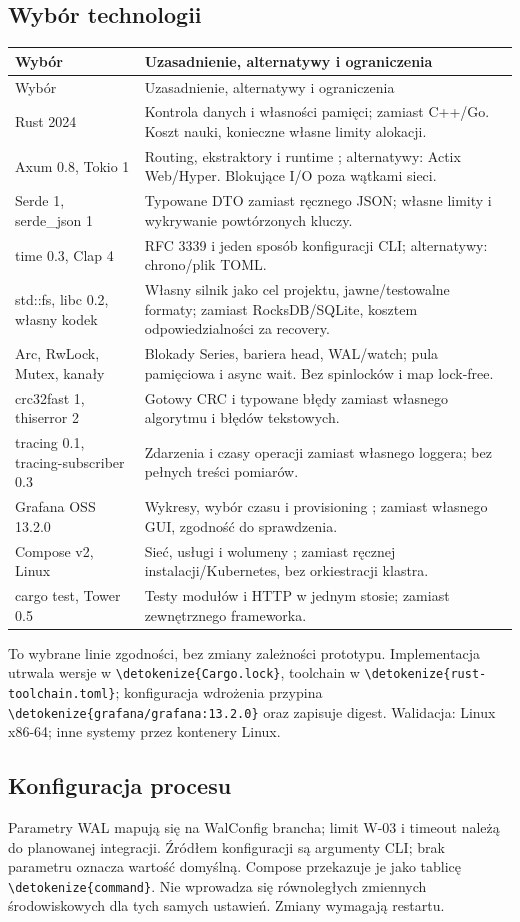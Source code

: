 \documentclass[11pt,a4paper]{article}
\newcommand{\code}[1]{\expandafter\nolinkurl\expandafter{\detokenize{#1}}}
\newcommand{\tabhead}[1]{\toprule #1\\ \midrule\endfirsthead
  \toprule #1\\ \midrule\endhead \bottomrule\endfoot}
\begin{document}
\subsection{Wybór technologii}
\begin{longtable}{P{37mm}P{119mm}}
\tabhead{Wybór & Uzasadnienie, alternatywy i ograniczenia}
Rust 2024 & Kontrola danych i własności pamięci; zamiast C++/Go.
Koszt nauki, konieczne własne limity alokacji.\\
Axum 0.8, Tokio 1 & Routing, ekstraktory i runtime \cite{axum};
alternatywy: Actix Web/Hyper. Blokujące I/O poza wątkami sieci.\\
Serde 1, serde\_json 1 & Typowane DTO zamiast ręcznego JSON;
własne limity i wykrywanie powtórzonych kluczy.\\
time 0.3, Clap 4 & RFC 3339 i jeden sposób konfiguracji CLI;
alternatywy: chrono/plik TOML.\\
std::fs, libc 0.2, własny kodek & Własny silnik jako cel projektu, jawne/testowalne
formaty; zamiast RocksDB/SQLite, kosztem odpowiedzialności za recovery.\\
Arc, RwLock, Mutex, kanały & Blokady Series, bariera head, WAL/watch;
pula pamięciowa i async wait. Bez spinlocków i map lock-free.\\
crc32fast 1, thiserror 2 & Gotowy CRC i typowane błędy zamiast własnego
algorytmu i błędów tekstowych.\\
tracing 0.1, tracing-subscriber 0.3 & Zdarzenia i czasy operacji
zamiast własnego loggera; bez pełnych treści pomiarów.\\
Grafana OSS 13.2.0 & Wykresy, wybór czasu i provisioning
\cite{grafana-provision}; zamiast własnego GUI, zgodność do sprawdzenia.\\
Compose v2, Linux & Sieć, usługi i wolumeny \cite{compose};
zamiast ręcznej instalacji/Kubernetes, bez orkiestracji klastra.\\
cargo test, Tower 0.5 & Testy modułów i HTTP w jednym stosie;
zamiast zewnętrznego frameworka.\\
\end{longtable}

To wybrane linie zgodności, bez zmiany zależności prototypu.
Implementacja utrwala wersje w \code{Cargo.lock}, toolchain
w \code{rust-toolchain.toml}; konfiguracja wdrożenia przypina
\code{grafana/grafana:13.2.0} oraz zapisuje digest.
Walidacja: Linux x86-64; inne systemy przez kontenery Linux.

\subsection{Konfiguracja procesu}
Parametry WAL mapują się na WalConfig brancha; limit W-03 i timeout
należą do planowanej integracji. Źródłem konfiguracji są argumenty CLI; brak parametru oznacza wartość
domyślną. Compose przekazuje je jako tablicę \code{command}.
Nie wprowadza się równoległych zmiennych środowiskowych dla tych samych
ustawień. Zmiany wymagają restartu.
\end{document}
